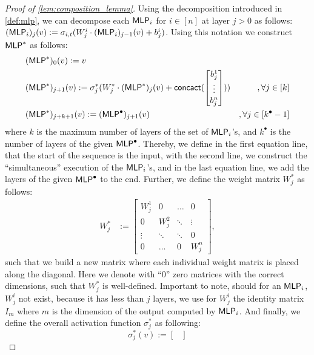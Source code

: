\begin{proof}[Proof of \cref{lem:composition_lemma}]
   Using the decomposition introduced in \cref{def:mlp}, we can decompose each $\textsf{MLP}_i$ for $i \in [n]$ at layer $j > 0$ as follows: $(\textsf{MLP}_i)_{j}(v) := \sigma_{i,t}(W^{i}_{j} \cdot (\textsf{MLP}_i)_{j-1}(v) + b^i_j)$. Using this notation we construct $\textsf{MLP}^*$ as follows:
    \begin{align*}
        &(\textsf{MLP}^*)_{0}(v) := v\\
        &(\textsf{MLP}^*)_{j+1}(v) := \sigma^*_j(W^*_j \cdot (\textsf{MLP}^*)_{j} (v) + \textsf{concact}(
            \begin{bmatrix}
                b^1_j\\
                \vdots\\
                b^n_j
            \end{bmatrix})) &,\forall j \in [k]\\
        &(\textsf{MLP}^*)_{j+k+1}(v) := (\textsf{MLP}^\bullet)_{j+1}(v) &,\forall j \in [k^\bullet - 1]
    \end{align*}
    where $k$ is the maximum number of layers of the set of $\textsf{MLP}_i$'s, and $k^\bullet$ is the number of layers of the given $\textsf{MLP}^\bullet$. Thereby, we define in the first equation line, that the start of the sequence is the input, with the second line, we construct the ``simultaneous'' execution of the $\textsf{MLP}_i$'s, and in the last equation line, we add the layers of the given $\textsf{MLP}^\bullet$ to the end. Further, we define the weight matrix $W_j^*$ as follows: 
    \begin{align*}
        W^*_j &:= \begin{bmatrix}
            W^1_j & 0 & \hdots & 0\\
            0 & W^2_j & \ddots & \vdots\\
            \vdots & \ddots & \ddots & 0\\
            0 & \hdots & 0 & W^n_j
        \end{bmatrix},
    \end{align*}
    such that we build a new matrix where each individual weight matrix is placed along the diagonal. Here we denote with ``$0$'' zero matrices with the correct dimensions, such that $W_j^*$ is well-defined. Important to note, should for an $\textsf{MLP}_i$, $W^i_j$ not exist, because it has less than $j$ layers, we use for $W^i_j$ the identity matrix $I_m$ where $m$ is the dimension of the output computed by $\textsf{MLP}_i$. And finally, we define the overall activation function $\sigma^*_j$ as following:
    \begin{equation*}
        \sigma^*_j(v) := \begin{bmatrix}

\end{bmatrix}
\end{equation*}
\end{proof}
